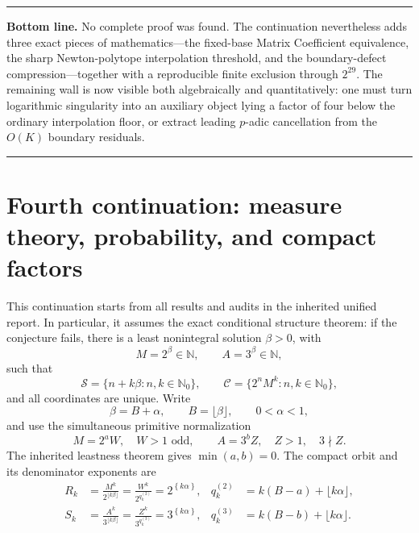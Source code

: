 \documentclass[11pt,oneside]{article}
\theoremstyle{definition}
\theoremstyle{remark}
\newcommand{\N}{\mathbb N}
\newcommand{\Nzero}{\mathbb N_0}
\newcommand{\Sol}{\mathcal S}
\newcommand{\Cand}{\mathcal C}
\newcommand{\fract}[1]{\left\{#1\right\}}
\newenvironment{resultbox}
{\begin{center}\begin{minipage}{0.94\textwidth}\hrule\vspace{0.45em}}
{\vspace{0.35em}\hrule\end{minipage}\end{center}}
\begin{document}
\begin{resultbox}
\textbf{Bottom line.}
No complete proof was found.  The continuation nevertheless adds three exact pieces of
mathematics---the fixed-base Matrix Coefficient equivalence, the sharp Newton-polytope
interpolation threshold, and the boundary-defect compression---together with a reproducible
finite exclusion through $2^{29}$.  The remaining wall is now visible both algebraically and
quantitatively: one must turn logarithmic singularity into an auxiliary object lying a factor
of four below the ordinary interpolation floor, or extract leading $p$-adic cancellation from
the $O(K)$ boundary residuals.
\end{resultbox}

\clearpage
\setcounter{section}{0}
\renewcommand{\thesection}{M\arabic{section}}
\renewcommand{\theHsection}{M.\arabic{section}}
\renewcommand{\theHsubsection}{\theHsection.\arabic{subsection}}
\renewcommand{\theHsubsubsection}{\theHsubsection.\arabic{subsubsection}}
\renewcommand{\theHtheorem}{\theHsection.\arabic{theorem}}

\section{Fourth continuation: measure theory, probability, and compact factors}
\label{mt:sec-scope}

This continuation starts from all results and audits in the inherited unified report.  In
particular, it assumes the exact conditional structure theorem: if the conjecture fails, there
is a least nonintegral solution $\beta>0$, with
\[
  M=2^\beta\in\N,
  \qquad A=3^\beta\in\N,
\]
such that
\[
  \Sol=\{n+k\beta:n,k\in\Nzero\},
  \qquad
  \Cand=\{2^nM^k:n,k\in\Nzero\},
\]
and all coordinates are unique.  Write
\begin{equation}
  \beta=B+\alpha,
  \qquad B=\lfloor\beta\rfloor,
  \qquad 0<\alpha<1,
  \label{mt:eq-beta-alpha}
\end{equation}
and use the simultaneous primitive normalization
\begin{equation}
  M=2^aW,
  \quad W>1\text{ odd},
  \qquad
  A=3^bZ,
  \quad Z>1,
  \quad 3\nmid Z.
  \label{mt:eq-WZ}
\end{equation}
The inherited leastness theorem gives $\min(a,b)=0$.  The compact orbit and its denominator
exponents are
\begin{align}
  R_k&=\frac{M^k}{2^{\lfloor k\beta\rfloor}}
      =\frac{W^k}{2^{q^{(2)}_k}}
      =2^{\fract{k\alpha}},
  &q^{(2)}_k&=k(B-a)+\lfloor k\alpha\rfloor,
  \label{mt:eq-Rq}\\
  S_k&=\frac{A^k}{3^{\lfloor k\beta\rfloor}}
      =\frac{Z^k}{3^{q^{(3)}_k}}
      =3^{\fract{k\alpha}},
  &q^{(3)}_k&=k(B-b)+\lfloor k\alpha\rfloor.
  \label{mt:eq-Sq}
\end{align}
\end{document}
